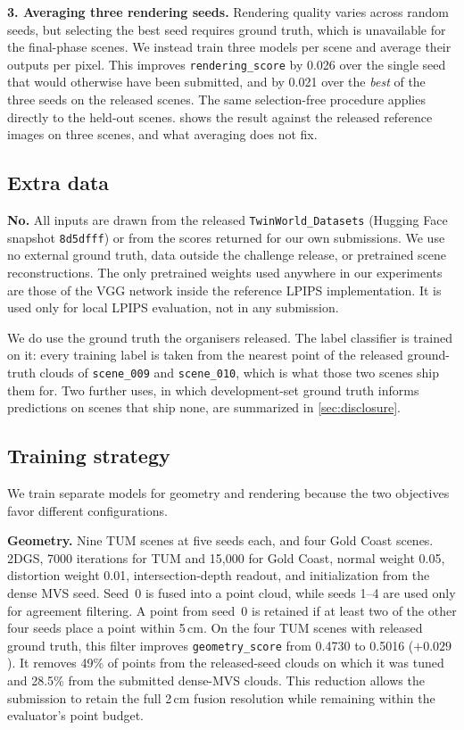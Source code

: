 \documentclass[10pt,twocolumn,letterpaper]{article}
\newcommand{\code}[1]{\texttt{\small #1}}
\newcommand{\runin}[1]{\par\smallskip\noindent\textbf{#1}\enspace}
\begin{document}
\runin{3. Averaging three rendering seeds.}
Rendering quality varies across random seeds, but selecting the best seed
requires ground truth, which is unavailable for the final-phase scenes. We
instead train three models per scene and average their outputs per pixel. This
improves \code{rendering\_score} by 0.026 over the single seed that would
otherwise have been submitted, and by 0.021 over the \emph{best} of the three
seeds on the released scenes. The same selection-free procedure applies directly
to the held-out scenes.  shows the result against the released
reference images on three scenes, and what averaging does not fix.

\subsection{Extra data}

\textbf{No.} All inputs are drawn from the released \code{TwinWorld\_Datasets}
(Hugging Face snapshot \code{8d5dfff}) or from the scores returned for our own
submissions. We use no external ground truth, data outside the challenge release,
or pretrained scene reconstructions. The only pretrained weights used anywhere
in our experiments are those of the VGG network inside the reference LPIPS
implementation. It is used only for local LPIPS evaluation, not in any
submission.

We do use the ground truth the organisers released. The label classifier is
trained on it: every training label is taken from the nearest point of the
released ground-truth clouds of \code{scene\_009} and \code{scene\_010}, which
is what those two scenes ship them for. Two further uses, in which development-set ground
truth informs predictions on scenes that ship none, are summarized in
\cref{sec:disclosure}.

\subsection{Training strategy}

We train separate models for geometry and rendering because the two objectives
favor different configurations.

\runin{Geometry.}
Nine TUM scenes at five seeds each, and four Gold Coast scenes. 2DGS,
7000 iterations for TUM and 15{,}000 for Gold Coast, normal weight 0.05,
distortion weight 0.01, intersection-depth readout, and initialization from the
dense MVS seed. Seed~0 is fused into a point cloud, while seeds 1--4 are used
only for agreement filtering. A point from seed~0 is retained if at least two of
the other four seeds place a point within 5\,cm. On the four TUM scenes with
released ground truth, this filter improves \code{geometry\_score} from 0.4730
to 0.5016 ($+0.029$). It removes 49\% of points from the released-seed clouds on
which it was tuned and 28.5\% from the submitted dense-MVS clouds. This reduction
allows the submission to retain the full 2\,cm fusion resolution while remaining
within the evaluator's point budget.
\end{document}
